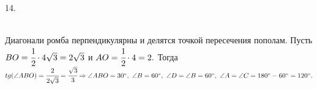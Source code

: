 14. \begin{figure}[ht!]
\end{figure}\\
Диагонали ромба перпендикулярны и делятся точкой пересечения пополам. Пусть $BO=\cfrac{1}{2}\cdot4\sqrt{3}=2\sqrt{3}$ и $AO=\cfrac{1}{2}\cdot4=2.$ Тогда $tg(\angle ABO)=\cfrac{2}{2\sqrt{3}}=\cfrac{\sqrt{3}}{3}\Rightarrow \angle ABO =30^\circ,\ \angle B=60^\circ,\ \angle D=\angle B=60^\circ,\ \angle A=\angle C=180^\circ-60^\circ=120^\circ.$\\
